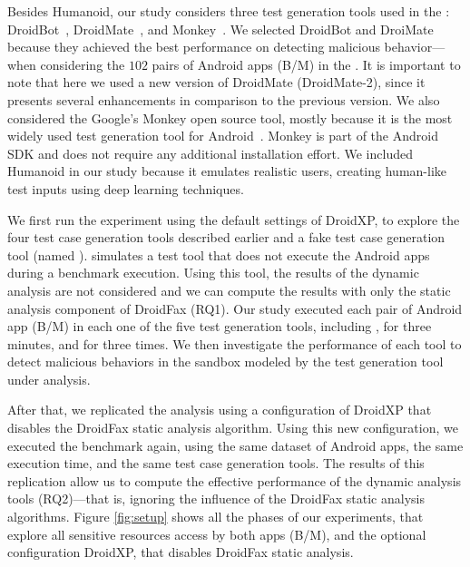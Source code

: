 Besides Humanoid, our study considers three test generation tools used in the \blls: DroidBot~\cite{DBLP:conf/icse/LiYGC17},
DroidMate~\cite{DBLP:conf/icse/JamrozikZ16}, and Monkey~\cite{Monkey}. We selected DroidBot and DroiMate because they achieved
the best performance on detecting malicious behavior---when considering the $102$ pairs of Android apps (B/M) in the \blls.
It is important to note that here we used a new version of DroidMate (DroidMate-2), since it presents several enhancements
in comparison to the previous version. We also considered the Google's Monkey open source tool, mostly because it is the most
widely used test generation tool for Android~\cite{DBLP:conf/sigsoft/ZengLZXDLYX16}. Monkey is part of the Android SDK
and does not require any additional installation effort. We included Humanoid in our study
because it emulates realistic users, creating human-like test inputs using deep learning techniques.




We first run the experiment using the default
settings of DroidXP, to explore the four test case generation tools described earlier and a fake test
case generation tool (named \joke). \joke simulates a test tool that does not execute
the Android apps during a benchmark execution. Using this tool, the results
of the dynamic analysis are not considered and we can compute the results with
only the static analysis component of DroidFax (RQ1). Our study executed each pair of
Android app (B/M) in each one of the five test generation tools, including \joke,
for three minutes, and for three times. We then investigate the performance of each tool to detect malicious behaviors in the sandbox
modeled by the test generation tool
under analysis. 


After that, we replicated the analysis using a configuration of DroidXP that disables the DroidFax static analysis algorithm.
Using this new configuration, we executed the benchmark again, using the same dataset of Android apps, the same execution time,
and the same test case generation tools.
The results of this replication allow us to compute the effective performance
of the dynamic analysis tools (RQ2)---that is, ignoring the influence of the
DroidFax static analysis algorithms.
Figure \ref{fig:setup} shows all the phases of our experiments, that explore all sensitive
resources access by both apps (B/M), and the optional configuration DroidXP, that disables DroidFax static analysis.


